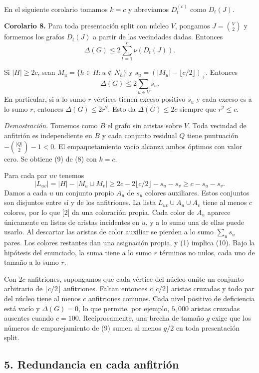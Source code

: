 \documentclass[spanish,11pt,a4paper]{article}
\begin{document}
En el siguiente corolario tomamos \(k=c\) y abreviamos \(D_t^{(c)}\) como \(D_t(J)\).

\textbf{Corolario 8.} Para toda presentación split con núcleo \(V\), pongamos \(J=\binom{V}{2}\) y formemos los grafos \(D_t(J)\) a partir de las vecindades dadas. Entonces
\[
\Delta(G)\le 2\sum_{t=1}^{c}\nu(D_t(J)). \tag{9}
\]

Si \(|H|\ge2c\), sean \(M_u=\{h\in H:u\notin N_h\}\) y \(s_u=(|M_u|-\lfloor c/2\rfloor)_+\). Entonces \[
\Delta(G)\le 2\sum_{u\in V}s_u. \tag{10}
\] En particular, si a lo sumo \(r\) vértices tienen exceso positivo \(s_u\) y cada exceso es a lo sumo \(r\), entonces \(\Delta(G)\le2r^2\). Esto da \(\Delta(G)\le2c\) siempre que \(r^2\le c\).

\emph{Demostración.} Tomemos como \(B\) el grafo sin aristas sobre \(V\). Toda vecindad de anfitrión es independiente en \(B\) y cada conjunto residual \(Q\) tiene puntuación \(-\binom{|Q|}{2}-1<0\). El empaquetamiento vacío alcanza ambos óptimos con valor cero. Se obtiene (9) de (8) con \(k=c\).

Para cada par \(uv\) tenemos \[
|L_{uv}|=|H|-|M_u\cup M_v|\ge 2c-2\lfloor c/2\rfloor-s_u-s_v\ge c-s_u-s_v .
\] Damos a cada \(u\) un conjunto propio \(A_u\) de \(s_u\) colores auxiliares. Estos conjuntos son disjuntos entre sí y de los anfitriones. La lista \(L_{uv}\cup A_u\cup A_v\) tiene al menos \(c\) colores, por lo que {[}2{]} da una coloración propia. Cada color de \(A_u\) aparece únicamente en listas de aristas incidentes en \(u\), y a lo sumo una de ellas puede usarlo. Al descartar las aristas de color auxiliar se pierden a lo sumo \(\sum_u s_u\) pares. Los colores restantes dan una asignación propia, y (1) implica (10). Bajo la hipótesis del enunciado, la suma tiene a lo sumo \(r\) términos no nulos, cada uno de tamaño a lo sumo \(r\).

Con \(2c\) anfitriones, supongamos que cada vértice del núcleo omite un conjunto arbitrario de \(\lfloor c/2\rfloor\) anfitriones. Faltan entonces \(c\lfloor c/2\rfloor\) aristas cruzadas y todo par del núcleo tiene al menos \(c\) anfitriones comunes. Cada nivel positivo de deficiencia está vacío y \(\Delta(G)=0\), lo que permite, por ejemplo, \(5{,}000\) aristas cruzadas ausentes cuando \(c=100\). Recíprocamente, una brecha de tamaño \(g\) exige que los números de emparejamiento de (9) sumen al menos \(g/2\) en toda presentación split.

\subsection{5. Redundancia en cada anfitrión}\label{redundancia-en-cada-anfitriuxf3n}
\end{document}

